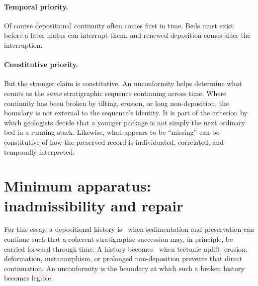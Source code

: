 \documentclass[11pt]{article}
\begin{document}
\paragraph{Temporal priority.}
Of course depositional continuity often comes first in time. Beds must exist before a later hiatus can interrupt them, and renewed deposition comes after the interruption.

\paragraph{Constitutive priority.}
But the stronger claim is constitutive. An unconformity helps determine what counts as the \emph{same} stratigraphic sequence continuing across time. Where continuity has been broken by tilting, erosion, or long non-deposition, the boundary is not external to the sequence's identity. It is part of the criterion by which geologists decide that a younger package is not simply the next ordinary bed in a running stack. Likewise, what appears to be ``missing'' can be constitutive of how the preserved record is individuated, correlated, and temporally interpreted.

\section{Minimum apparatus: inadmissibility and repair}
\begin{definition}
For this essay, a depositional history is \admissible\ when sedimentation and preservation can continue such that a coherent stratigraphic succession may, in principle, be carried forward through time. A history becomes \inadmissible\ when tectonic uplift, erosion, deformation, metamorphism, or prolonged non-deposition prevents that direct continuation. An unconformity is the boundary at which such a broken history becomes legible.
\end{definition}
\end{document}
